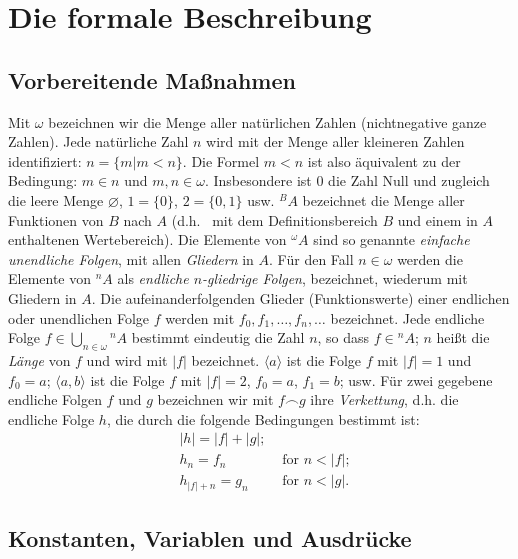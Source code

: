 \section{Die formale Beschreibung}

\subsection[Vorbereitende Maßnahmen]{Vorbereitende Maßnahmen\protect\footnotemark}%

Mit $\omega$ bezeichnen wir die Menge aller natürlichen Zahlen (nichtnegative ganze Zahlen). Jede natürliche Zahl $n$ wird mit der Menge aller kleineren Zahlen identifiziert: $n = \{ m | m < n \}$.  Die Formel $m < n$ ist also äquivalent zu der Bedingung: $m \in n$ und $m,n \in \omega$. Insbesondere ist 0 die Zahl Null und zugleich die leere Menge $\varnothing$, $1=\{0\}$, $2=\{0,1\}$ usw. ${}^B A$ bezeichnet die Menge aller Funktionen von  $B$ nach $A$ (d.h. \ mit dem Definitionsbereich $B$ und einem in $A$ enthaltenen Wertebereich).  Die Elemente von ${}^\omega A$ sind so genannte {\em einfache unendliche Folgen}, mit allen {\em Gliedern} in $A$.  Für den Fall $n \in \omega$ werden die Elemente von ${}^n A$ als {\em endliche $n$-gliedrige Folgen}, bezeichnet, wiederum mit Gliedern in $A$.  Die aufeinanderfolgenden Glieder (Funktionswerte) einer endlichen oder unendlichen Folge $f$ werden mit $f_0, f_1, \ldots ,f_n,\ldots$ bezeichnet.  Jede endliche Folge $f \in \bigcup _{n \in \omega} {}^n A$ bestimmt eindeutig die Zahl $n$, so dass $f \in {}^n A$; $n$ heißt die {\em Länge} von $f$ und wird mit $|f|$ bezeichnet.  $\langle a \rangle$ ist die Folge $f$ mit $|f|=1$ und $f_0=a$; $\langle a,b \rangle$ ist die Folge $f$ mit $|f|=2$, $f_0=a$, $f_1=b$; usw.  Für zwei gegebene endliche Folgen $f$ und $g$ bezeichnen wir mit $f\frown g$ ihre {\em Verkettung}, d.h. die endliche Folge $h$, die durch die folgende Bedingungen bestimmt ist: 
\begin{eqnarray*}
& |h| = |f|+|g|;&  \\
& h_n = f_n & \mbox{\ for\ } n < |f|;  \\
& h_{|f|+n} = g_n & \mbox{\ for\ } n < |g|.
\end{eqnarray*}

\subsection{Konstanten, Variablen und Ausdrücke}

